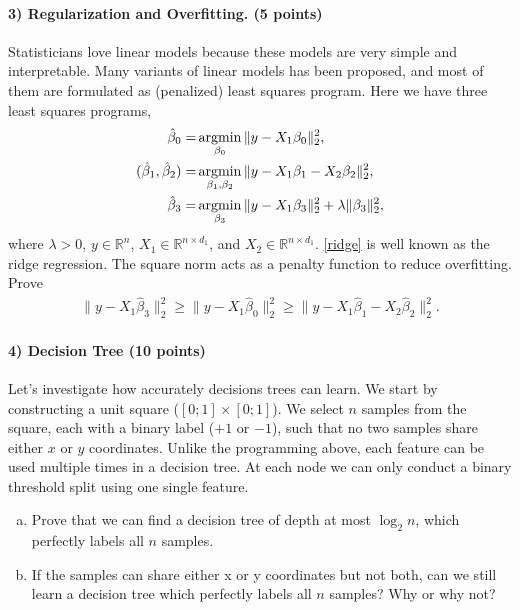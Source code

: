 \documentclass[11pt]{article}
\begin{document}


\paragraph{3) Regularization and Overfitting. (5 points)}
Statisticians love linear models because these models are very simple and interpretable. Many variants of linear models has been proposed, and most of them are formulated as (penalized) least squares program. Here we have three least squares programs,
\begin{align}
\hat{\beta}_0 = &\mathop{\rm argmin}_{\beta_0}  \|y-X_1\beta_0\|_2^2, \label{partial}\\
(\hat{\beta}_1,\hat{\beta}_2) = &\mathop{\rm argmin}_{\beta_1,\beta_2}  \|y-X_1\beta_1-X_2\beta_2\|_2^2, \label{complete}\\
\hat{\beta}_3 = &\mathop{\rm argmin}_{\beta_3} \|y-X_1\beta_3\|_2^2 +\lambda\|\beta_3\|_2^2 \label{ridge},
\end{align}
where $\lambda>0$, $y\in\mathbb{R}^n$, $X_1\in\mathbb{R}^{n \times d_1}$, and $X_2\in\mathbb{R}^{n \times d_1}$. \eqref{ridge} is well known as the ridge regression. The square norm acts as a penalty function to reduce overfitting. Prove
\begin{align}\label{overfitting}
\|y-X_1\hat{\beta}_3\|_2^2 \geq \|y-X_1\hat{\beta}_0\|_2^2 \geq \|y-X_1\hat{\beta}_1-X_2\hat{\beta}_2\|_2^2.
\end{align}

\paragraph{4) Decision Tree (10 points)} Let's investigate how accurately decisions trees can learn. We start by constructing a unit square ($[0; 1] \times [0;1]$). We select $n$ samples from the square, each with a binary label ($+1$ or $-1$), such that no two samples share either $x$ or $y$ coordinates.  Unlike the programming above, each feature can be used multiple times in a decision tree. At each node we can only conduct a binary threshold split using one single feature. 
\begin{enumerate}[(a)]
\item Prove that we can find a decision tree of depth at most $\log_2n$, which perfectly labels all $n$ samples. 
\item If the samples can share either x or y coordinates but not both, can we still learn a decision tree which perfectly labels all $n$ samples? Why or why not?
\end{enumerate}
\end{document}
